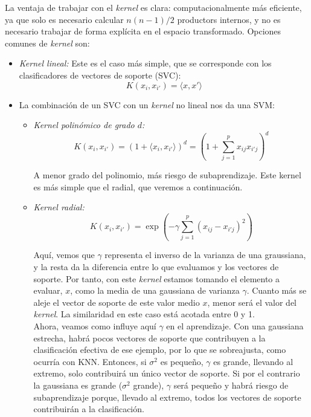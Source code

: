 La ventaja de trabajar con el \textit{kernel} es clara: computacionalmente más eficiente, ya que solo es necesario calcular $n(n-1)/2$ productors internos, y no es necesario trabajar de forma explícita en el espacio transformado. Opciones comunes de \textit{kernel} son:
\begin{itemize}
\item \textit{Kernel lineal:} Este es el caso más simple, que se corresponde con los clasificadores de vectores de soporte (SVC):
\begin{equation}
K(x_i, x_{i'}) = \langle x, x' \rangle
\end{equation}
\item La combinación de un SVC con un \textit{kernel} no lineal nos da una SVM: 
\begin{itemize}
\item \textit{Kernel polinómico de grado $d$:} 
\begin{equation}
K(x_i, x_{i'}) = (1 + \langle x_i, x_{i'} \rangle)^d = \left(1 + \sum_{j = 1}^p x_{ij} x_{i'j}\right)^d
\end{equation}

A menor grado del polinomio, más riesgo de subaprendizaje. Este kernel es más simple que el radial, que veremos a continuación.
\item \textit{Kernel radial:}
\begin{equation}
K(x_i, x_{i'}) = \exp \left( - \gamma \sum_{j = 1}^p (x_{ij} - x_{i'j})^2 \right)
\end{equation}

Aquí, vemos que $\gamma$ representa el inverso de la varianza de una graussiana, y la resta da la diferencia entre lo que evaluamos y los vectores de soporte. Por tanto, con este \textit{kernel} estamos tomando el elemento a evaluar, $x$, como la media de una gaussiana de varianza $\gamma$. Cuanto más se aleje el vector de soporte de este valor medio $x$, menor será el valor del \textit{kernel}. La similaridad en este caso está acotada entre 0 y 1. \\

Ahora, veamos como influye aquí $\gamma$ en el aprendizaje. Con una gaussiana estrecha, habrá pocos vectores de soporte que contribuyen a la clasificación efectiva de ese ejemplo, por lo que se sobreajusta, como ocurría con KNN. Entonces, si $\sigma^2$ es pequeño, $\gamma$ es grande, llevando al extremo, solo contribuirá un único vector de soporte. Si por el contrario la gaussiana es grande ($\sigma^2$ grande), $\gamma$ será pequeño y habrá riesgo de subaprendizaje porque, llevado al extremo, todos los vectores de soporte contribuirán a la clasificación.
\end{itemize}
\end{itemize}

